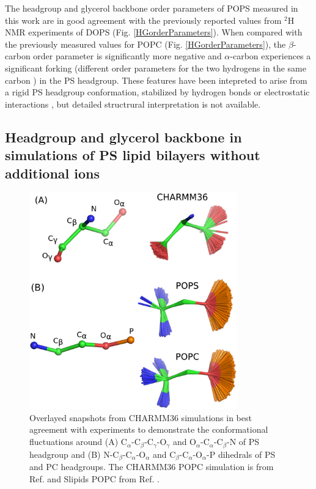 \documentclass[aps,prl,superscriptaddress,twocolumn]{revtex4}
\begin{document}
The headgroup and glycerol backbone order parameters of 
POPS measured in this work are in good agreement with the previously reported
values from $^2$H\,NMR experiments of DOPS \cite{browning80} (Fig. \ref{HGorderParameters}).
When compared with the previously measured values for POPC \cite{ferreira13} (Fig. \ref{HGorderParameters}),
the $\beta$-carbon order parameter is significantly more negative and $\alpha$-carbon
experiences a significant forking (different order parameters for the two hydrogens in the same carbon \cite{ollila16}) in the PS headgroup.
These features have been intepreted to arise from a rigid PS headgroup
conformation, stabilized by hydrogen bonds or electrostatic
interactions \cite{browning80,buldt81}, but detailed structrural interpretation is not
available. 




\subsection{Headgroup and glycerol backbone in simulations of PS lipid bilayers without additional ions}

\begin{figure}[]
  \centering
  \includegraphics[width=9.0cm]{../Figs/structures.eps}
  \caption{\label{HGstructuresPSandPC}
    Overlayed snapshots from CHARMM36 simulations in best agreement with experiments
    to demonstrate the conformational fluctuations around
    (A) C$_\alpha$-C$_\beta$-C$_\gamma$-O$_\gamma$ and  O$_\alpha$-C$_\alpha$-C$_\beta$-N
    of PS headgroup and (B) N-C$_\beta$-C$_\alpha$-O$_\alpha$ and C$_\beta$-C$_\alpha$-O$_\alpha$-P
    dihedrals of PS and PC headgroups.
    The CHARMM36 POPC simulation is from Ref.  and Slipids POPC from Ref. .
  }
\end{figure}
\end{document}
